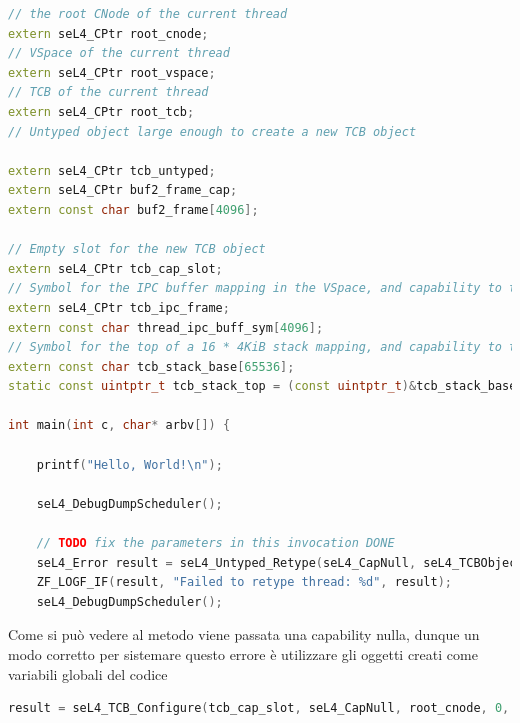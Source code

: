\begin{lstlisting}[language=C++]
// the root CNode of the current thread
extern seL4_CPtr root_cnode;
// VSpace of the current thread
extern seL4_CPtr root_vspace;
// TCB of the current thread
extern seL4_CPtr root_tcb;
// Untyped object large enough to create a new TCB object

extern seL4_CPtr tcb_untyped;
extern seL4_CPtr buf2_frame_cap;
extern const char buf2_frame[4096];

// Empty slot for the new TCB object
extern seL4_CPtr tcb_cap_slot;
// Symbol for the IPC buffer mapping in the VSpace, and capability to the mapping
extern seL4_CPtr tcb_ipc_frame;
extern const char thread_ipc_buff_sym[4096];
// Symbol for the top of a 16 * 4KiB stack mapping, and capability to the mapping
extern const char tcb_stack_base[65536];
static const uintptr_t tcb_stack_top = (const uintptr_t)&tcb_stack_base + sizeof(tcb_stack_base);

int main(int c, char* arbv[]) {

    printf("Hello, World!\n");

    seL4_DebugDumpScheduler();

    // TODO fix the parameters in this invocation DONE
    seL4_Error result = seL4_Untyped_Retype(seL4_CapNull, seL4_TCBObject, seL4_TCBBits, seL4_CapNull, 0, 0, seL4_CapNull, 1);
    ZF_LOGF_IF(result, "Failed to retype thread: %d", result);
    seL4_DebugDumpScheduler();
\end{lstlisting}
Come si può vedere al metodo viene passata una capability nulla, dunque un modo corretto per sistemare questo errore è utilizzare gli oggetti creati come variabili globali del codice
\begin{lstlisting}[language=C++]
result = seL4_TCB_Configure(tcb_cap_slot, seL4_CapNull, root_cnode, 0, root_vspace, 0, (seL4_Word) thread_ipc_buff_sym, tcb_ipc_frame);
\end{lstlisting}